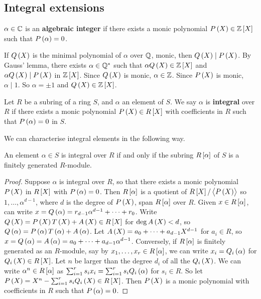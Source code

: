 \subsection{Integral extensions}

\begin{definition}
$ \alpha \in \mathbb{C} $ is an \textbf{algebraic integer} if there exists a monic polynomial $ P\br{X} \in \ZZ\sbr{X} $ such that $ P\br{\alpha} = 0 $.
\end{definition}

\begin{note*}
If $ Q\br{X} $ is the minimal polynomial of $ \alpha $ over $ \mathbb{Q} $, monic, then $ Q\br{X} \mid P\br{X} $. By Gauss' lemma, there exists $ \alpha \in \mathbb{Q}^* $ such that $ \alpha Q\br{X} \in \ZZ\sbr{X} $ and $ \alpha Q\br{X} \mid P\br{X} $ in $ \ZZ\sbr{X} $. Since $ Q\br{X} $ is monic, $ \alpha \in \mathbb{Z} $. Since $ P\br{X} $ is monic, $ \alpha \mid 1 $. So $ \alpha = \pm 1 $ and $ Q\br{X} \in \ZZ\sbr{X} $.
\end{note*}

\begin{definition}
Let $ R $ be a subring of a ring $ S $, and $ \alpha $ an element of $ S $. We say $ \alpha $ is \textbf{integral} over $ R $ if there exists a monic polynomial $ P\br{X} \in R\sbr{X} $ with coefficients in $ R $ such that $ P\br{\alpha} = 0 $ in $ S $.
\end{definition}

We can characterise integral elements in the following way.

\begin{proposition}
An element $ \alpha \in S $ is integral over $ R $ if and only if the subring $ R\sbr{\alpha} $ of $ S $ is a finitely generated $ R $-module.
\end{proposition}

\begin{proof}
Suppose $ \alpha $ is integral over $ R $, so that there exists a monic polynomial $ P\br{X} $ in $ R\sbr{X} $ with $ P\br{\alpha} = 0 $. Then $ R\sbr{\alpha} $ is a quotient of $ R\sbr{X} / \abr{P\br{X}} $ so $ 1, \dots, \alpha^{d - 1} $, where $ d $ is the degree of $ P\br{X} $, span $ R\sbr{\alpha} $ over $ R $. Given $ x \in R\sbr{\alpha} $, can write $ x = Q\br{\alpha} = r_{d - 1}\alpha^{d - 1} + \dots + r_0 $. Write $ Q\br{X} = P\br{X}T\br{X} + A\br{X} \in R\sbr{X} $ for $ \deg A\br{X} < d $, so $ Q\br{\alpha} = P\br{\alpha}T\br{\alpha} + A\br{\alpha} $. Let $ A\br{X} = a_0 + \dots + a_{d - 1}X^{d - 1} $ for $ a_i \in R $, so $ x = Q\br{\alpha} = A\br{\alpha} = a_0 + \dots + a_{d - 1}\alpha^{d - 1} $. Conversely, if $ R\sbr{\alpha} $ is finitely generated as an $ R $-module, say by $ x_1, \dots, x_r \in R\sbr{\alpha} $, we can write $ x_i = Q_i\br{\alpha} $ for $ Q_i\br{X} \in R\sbr{X} $. Let $ n $ be larger than the degree $ d_i $ of all the $ Q_i\br{X} $. We can write $ \alpha^n \in R\sbr{\alpha} $ as $ \sum_{i = 1}^r s_ix_i = \sum_{i = 1}^r s_iQ_i\br{\alpha} $ for $ s_i \in R $. So let $ P\br{X} = X^n - \sum_{i = 1}^r s_iQ_i\br{X} \in R\sbr{X} $. Then $ P\br{X} $ is a monic polynomial with coefficients in $ R $ such that $ P\br{\alpha} = 0 $.
\end{proof}

